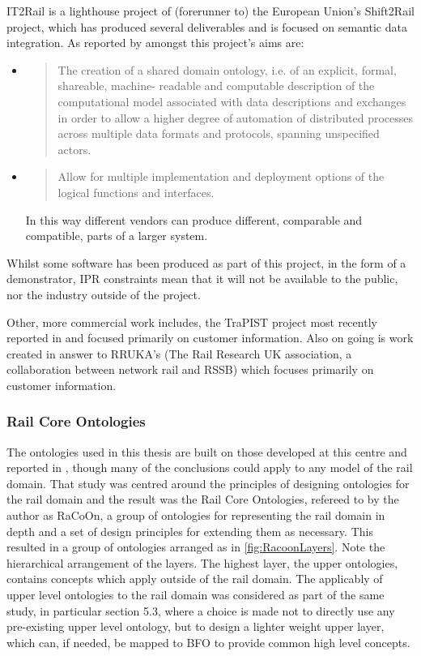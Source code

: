 IT2Rail is a lighthouse project of (\ie forerunner to) the European Union's Shift2Rail project, which has produced several deliverables and is focused on semantic data integration. As reported by \citet{Gogos2016} amongst this project's aims are:
\begin{itemize}
    \item 
    \begin{quote}
    The creation of a shared domain ontology, i.e. of an explicit, formal, shareable, machine-
readable and computable description of the computational model associated with data
descriptions and exchanges in order to allow a higher degree of automation of distributed
processes across multiple data formats and protocols, spanning unspecified actors.
    \end{quote}
    \item 
    \begin{quote}
    Allow for multiple implementation and deployment options of the logical functions and
interfaces.
    \end{quote}
 In this way different vendors can produce different, comparable and compatible, parts of a larger system.
\end{itemize}

Whilst some software has been produced as part of this project, in the form of a demonstrator, IPR constraints mean that it will not be available to the public, nor the industry outside of the project.

Other, more commercial work includes, the TraPIST project most recently reported in \citet{Bhatti2016} and focused primarily on customer information. Also on going is work created in answer to RRUKA's (The Rail Research UK association, a collaboration between network rail and RSSB)  which focuses primarily on customer information.

\subsubsection{Rail Core Ontologies}
The ontologies used in this thesis are built on those developed at this centre and reported in \citet{Tutcher2015}, though many of the conclusions could apply to any model of the rail domain. That study was centred around the principles of designing ontologies for the rail domain and the result was the Rail Core Ontologies, refereed to by the author as RaCoOn, a group of ontologies for representing the rail domain in depth and a set of design principles for extending them as necessary. This resulted in a group of ontologies arranged as in \autoref{fig:RacoonLayers}. Note the hierarchical arrangement of the layers. The highest layer, the upper ontologies, contains concepts which apply outside of the rail domain. The applicably of upper level ontologies to the rail domain was considered as part of the same study, in particular section 5.3, where a choice is made not to directly use any pre-existing upper level ontology, but to design a lighter weight upper layer, which can, if needed, be mapped to BFO to provide common high level concepts.

